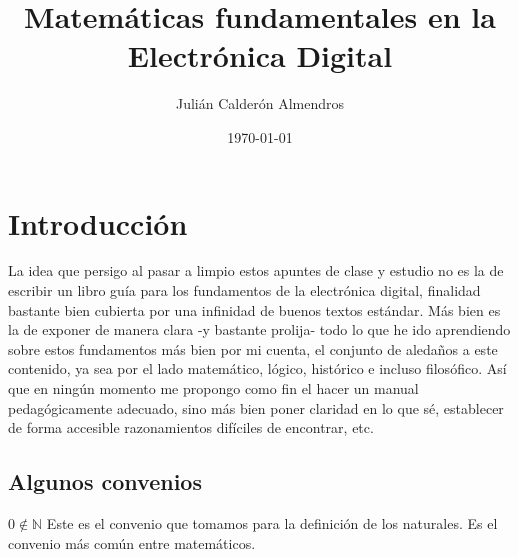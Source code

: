 \documentclass[final,12pt,a4paper,twoside,fleqn]{extbook}
\providecommand{\printnomenclature}{\printglossary}
\newcommand{\setN}{\ensuremath{\mathds{N}}}
\theoremstyle{definition}
\theoremstyle{remark}
\begin{document}
\title{
    Matemáticas fundamentales en la Electrónica Digital
}

\author{
    Julián Calderón Almendros
}

\date{\today}

\maketitle


\makeatletter

\tableofcontents{}
\makeatletter
\listoffigures
\makeatletter
\listoftables
\makeatletter



\newcommand {\setNz}{\ensuremath{{\setN}_{\mathsf{0}}}}
\newcommand {\setL}{\ensuremath{\mathbb{L}}}
\newcommand {\retL}{\ensuremath{\mathscr{L}}}

\chapter{Introducción}



La idea que persigo al pasar a limpio estos apuntes de clase y estudio no es
la de escribir un libro guía para los fundamentos de la electrónica digital,
finalidad bastante bien cubierta por una infinidad de buenos textos estándar.
Más bien es la de exponer de manera clara -y bastante prolija- todo lo que he
ido aprendiendo sobre estos fundamentos más bien por mi cuenta, el conjunto
de aledaños a este contenido, ya sea por el lado matemático, lógico,
histórico e incluso filosófico. Así que en ningún momento me propongo como
fin el hacer un manual pedagógicamente adecuado, sino más bien poner claridad
en lo que sé, establecer de forma accesible razonamientos difíciles de
encontrar, etc.



\section{Algunos convenios}



\(0 \notin \setN\) Este es el convenio que tomamos para la definición de los
naturales. Es el convenio más común entre matemáticos.
\end{document}
